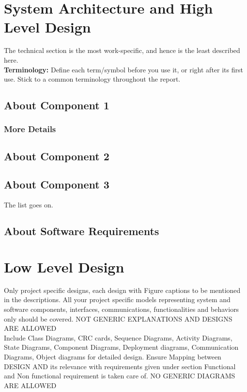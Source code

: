 

\chapter{System Architecture and High Level Design}
The technical section is the most  work-specific, and hence is the least described here.\\
\textbf{Terminology: }Define each term/symbol before you use it, or right after its first use. Stick to a common terminology throughout the report. \\

\section{About Component 1}

\subsection{More Details}

\section{About Component 2}

\section{About Component 3}

The list goes on.



\section{About Software Requirements}



\chapter{Low Level Design}
Only project specific designs, each design with Figure captions to be mentioned in the descriptions. All your project specific models representing system and software components, interfaces, communications, functionalities and behaviors only should be covered. NOT GENERIC EXPLANATIONS AND DESIGNS ARE ALLOWED\\
Include Class Diagrams, CRC cards, Sequence Diagrams, Activity Diagrams, State Diagrams, Component Diagrams, Deployment diagrams, Communication Diagrams, Object diagrams  for detailed design. Ensure Mapping between DESIGN AND its relevance with requirements given under section Functional and Non functional requirement is taken care of.  
NO GENERIC DIAGRAMS ARE ALLOWED

